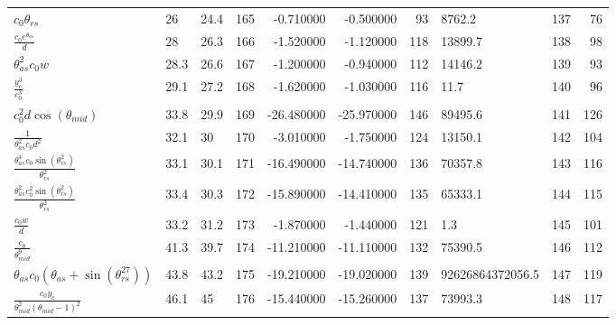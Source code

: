 \begin{tabularx}{\textwidth}{lllrrrrlrr}
$ c_{0} \theta_{rs} $  &  26\phantom{.0}  &  24.4  &  165  &  -0.710000  &  -0.500000  &  93  &  8762.2  &  137\phantom{.000000}  &  76\phantom{.000000}  \\ 
$ \displaystyle\frac{c_{0} e^{\theta_{as}}}{d} $  &  28\phantom{.0}  &  26.3  &  166  &  -1.520000  &  -1.120000  &  118  &  13899.7  &  138\phantom{.000000}  &  98\phantom{.000000}  \\ 
$ \theta_{as}^{2} c_{0} w $  &  28.3  &  26.6  &  167  &  -1.200000  &  -0.940000  &  112  &  14146.2  &  139\phantom{.000000}  &  93\phantom{.000000}  \\ 
$ \displaystyle\frac{y_c^{3}}{c_{0}^{3}} $  &  29.1  &  27.2  &  168  &  -1.620000  &  -1.030000  &  116  &  11.7  &  140\phantom{.000000}  &  96\phantom{.000000}  \\ 
$ c_{0}^{2} d \cos{\left(\theta_{mid} \right)} $  &  33.8  &  29.9  &  169  &  -26.480000  &  -25.970000  &  146  &  89495.6  &  141\phantom{.000000}  &  126\phantom{.000000}  \\ 
$ \displaystyle\frac{1}{\theta_{as}^{2} c_{0} d^{2}} $  &  32.1  &  30\phantom{.0}  &  170  &  -3.010000  &  -1.750000  &  124  &  13150.1  &  142\phantom{.000000}  &  104\phantom{.000000}  \\ 
$ \displaystyle\frac{\theta_{as}^{4} c_{0} \sin{\left(\theta_{rs}^{2} \right)}}{\theta_{rs}^{2}} $  &  33.1  &  30.1  &  171  &  -16.490000  &  -14.740000  &  136  &  70357.8  &  143\phantom{.000000}  &  116\phantom{.000000}  \\ 
$ \displaystyle\frac{\theta_{as}^{2} c_{0}^{2} \sin{\left(\theta_{rs}^{2} \right)}}{\theta_{rs}^{2}} $  &  33.4  &  30.3  &  172  &  -15.890000  &  -14.410000  &  135  &  65333.1  &  144\phantom{.000000}  &  115\phantom{.000000}  \\ 
$ \displaystyle\frac{c_{0} w}{d} $  &  33.2  &  31.2  &  173  &  -1.870000  &  -1.440000  &  121  &  1.3  &  145\phantom{.000000}  &  101\phantom{.000000}  \\ 
$ \displaystyle\frac{c_{0}}{\theta_{mid}^{9}} $  &  41.3  &  39.7  &  174  &  -11.210000  &  -11.110000  &  132  &  75390.5  &  146\phantom{.000000}  &  112\phantom{.000000}  \\ 
$ \theta_{as} c_{0} \left(\theta_{as} + \sin{\left(\theta_{rs}^{27} \right)}\right) $  &  43.8  &  43.2  &  175  &  -19.210000  &  -19.020000  &  139  &  92626864372056.5  &  147\phantom{.000000}  &  119\phantom{.000000}  \\ 
$ \displaystyle\frac{c_{0} y_c}{\theta_{mid}^{2} \left(\theta_{mid} - 1\right)^{2}} $  &  46.1  &  45\phantom{.0}  &  176  &  -15.440000  &  -15.260000  &  137  &  73993.3  &  148\phantom{.000000}  &  117\phantom{.000000}  \\ 

\end{tabularx}
